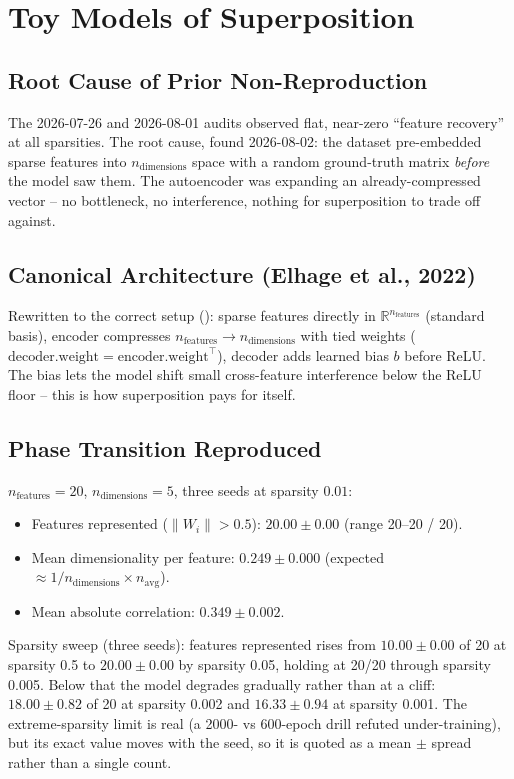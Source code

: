 \documentclass[11pt]{article}
\begin{document}
\section{Toy Models of Superposition}
\label{sec:superposition}

\subsection{Root Cause of Prior Non-Reproduction}
The 2026-07-26 and 2026-08-01 audits observed flat, near-zero ``feature
recovery'' at all sparsities. The root cause, found 2026-08-02: the
dataset pre-embedded sparse features into $n_\text{dimensions}$ space with
a random ground-truth matrix \emph{before} the model saw them. The
autoencoder was expanding an already-compressed vector -- no bottleneck,
no interference, nothing for superposition to trade off against.

\subsection{Canonical Architecture (Elhage et al., 2022)}
Rewritten to the correct setup (\citep{elhage2022superposition}): sparse features directly in
$\mathbb{R}^{n_\text{features}}$ (standard basis), encoder compresses
$n_\text{features} \to n_\text{dimensions}$ with tied weights
($\text{decoder.weight} = \text{encoder.weight}^\top$), decoder adds
learned bias $b$ before ReLU. The bias lets the model shift small
cross-feature interference below the ReLU floor -- this is how
superposition pays for itself.

\subsection{Phase Transition Reproduced}
$n_\text{features}=20$, $n_\text{dimensions}=5$, three seeds at
sparsity $0.01$:
\begin{itemize}
  \item Features represented ($\|W_i\| > 0.5$): $20.00 \pm 0.00$ (range
    20--20 / 20).
  \item Mean dimensionality per feature: $0.249 \pm 0.000$ (expected
    $\approx 1/n_\text{dimensions} \times n_\text{avg}$).
  \item Mean absolute correlation: $0.349 \pm 0.002$.
\end{itemize}

Sparsity sweep (three seeds): features represented rises from
$10.00 \pm 0.00$ of 20 at sparsity 0.5 to $20.00 \pm 0.00$ by sparsity
0.05, holding at 20/20 through sparsity 0.005. Below that the model
degrades gradually rather than at a cliff: $18.00 \pm 0.82$ of 20 at
sparsity 0.002 and $16.33 \pm 0.94$ at sparsity 0.001. The extreme-sparsity
limit is real (a 2000- vs 600-epoch drill refuted under-training), but its
exact value moves with the seed, so it is quoted as a mean $\pm$ spread
rather than a single count.
\end{document}
